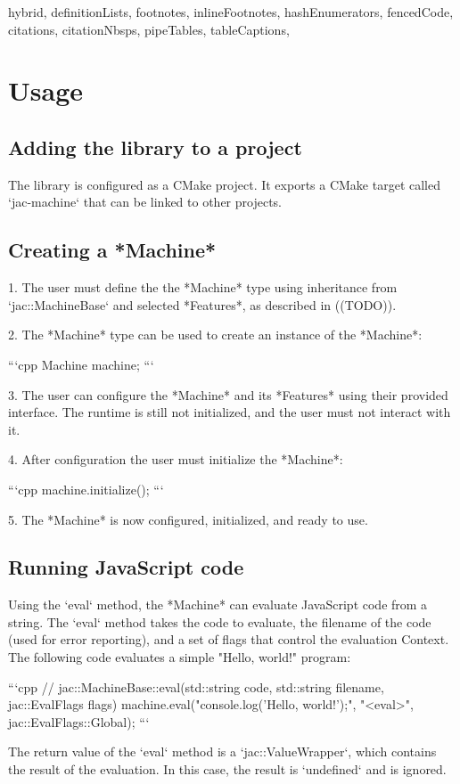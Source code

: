 \documentclass[
  digital,
  oneside,
  nosansbold,
  nocolorbold,
  lof,
  lot
]{fithesis4}
\begin{document}
\begin{markdown*}{%
  hybrid,
  definitionLists,
  footnotes,
  inlineFootnotes,
  hashEnumerators,
  fencedCode,
  citations,
  citationNbsps,
  pipeTables,
  tableCaptions,
}
\section{Usage}

\subsection{Adding the library to a project}

The library is configured as a CMake project. It exports a CMake target called `jac-machine` that can be linked to other projects.

\subsection{Creating a *Machine*}

 1. The user must define the the *Machine* type using inheritance from `jac::MachineBase` and selected *Features*, as described in ((TODO)).

 2. The *Machine* type can be used to create an instance of the *Machine*:

```cpp
Machine machine;
```

 3. The user can configure the *Machine* and its *Features* using their provided interface. The runtime is still not initialized, and the user must not interact with it.

 4. After configuration the user must initialize the *Machine*:

```cpp
machine.initialize();
```

 5. The *Machine* is now configured, initialized, and ready to use.

\subsection{Running JavaScript code}

Using the `eval` method, the *Machine* can evaluate JavaScript code from a string. The `eval` method takes the code to evaluate, the filename of the code (used for error reporting), and a set of flags that control the evaluation Context. The following code evaluates a simple "Hello, world!" program:

```cpp
// jac::MachineBase::eval(std::string code, std::string filename, jac::EvalFlags flags)
machine.eval("console.log('Hello, world!');", "<eval>", jac::EvalFlags::Global);
```

The return value of the `eval` method is a `jac::ValueWrapper`, which contains the result of the evaluation. In this case, the result is `undefined` and is ignored.


\end{markdown*}
\end{document}

